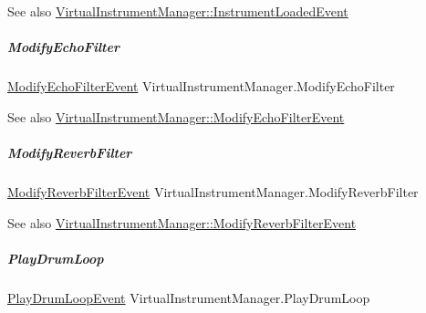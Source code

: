 \begin{DoxySeeAlso}{See also}
\hyperlink{group___virtual_instrument_manager_class_virtual_instrument_manager_1_1_instrument_loaded_event}{Virtual\+Instrument\+Manager\+::\+Instrument\+Loaded\+Event} 
\end{DoxySeeAlso}
\mbox{\label{group___virtual_instrument_manager_a112ed15f48fd261f1ad71c3c953c0a58}} 
\subparagraph{\texorpdfstring{Modify\+Echo\+Filter}{ModifyEchoFilter}}
{\footnotesize\ttfamily \hyperlink{group___virtual_instrument_manager_class_virtual_instrument_manager_1_1_modify_echo_filter_event}{Modify\+Echo\+Filter\+Event} Virtual\+Instrument\+Manager.\+Modify\+Echo\+Filter}

\begin{DoxySeeAlso}{See also}
\hyperlink{group___virtual_instrument_manager_class_virtual_instrument_manager_1_1_modify_echo_filter_event}{Virtual\+Instrument\+Manager\+::\+Modify\+Echo\+Filter\+Event} 
\end{DoxySeeAlso}
\mbox{\label{group___virtual_instrument_manager_aadd137e073cb3849f610a46e0d032858}} 
\subparagraph{\texorpdfstring{Modify\+Reverb\+Filter}{ModifyReverbFilter}}
{\footnotesize\ttfamily \hyperlink{group___virtual_instrument_manager_class_virtual_instrument_manager_1_1_modify_reverb_filter_event}{Modify\+Reverb\+Filter\+Event} Virtual\+Instrument\+Manager.\+Modify\+Reverb\+Filter}

\begin{DoxySeeAlso}{See also}
\hyperlink{group___virtual_instrument_manager_class_virtual_instrument_manager_1_1_modify_reverb_filter_event}{Virtual\+Instrument\+Manager\+::\+Modify\+Reverb\+Filter\+Event} 
\end{DoxySeeAlso}
\mbox{\label{group___virtual_instrument_manager_a5657ff4bcc7de6d240d7092ffd22a6fe}} 
\subparagraph{\texorpdfstring{Play\+Drum\+Loop}{PlayDrumLoop}}
{\footnotesize\ttfamily \hyperlink{group___virtual_instrument_manager_class_virtual_instrument_manager_1_1_play_drum_loop_event}{Play\+Drum\+Loop\+Event} Virtual\+Instrument\+Manager.\+Play\+Drum\+Loop}

